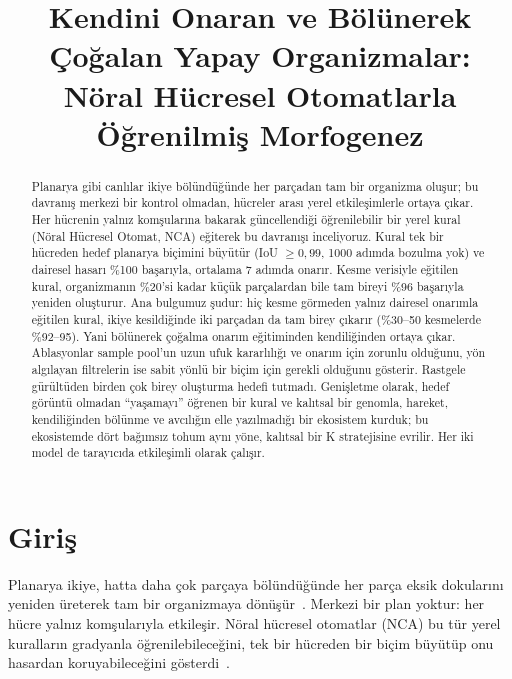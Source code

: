 \documentclass[conference]{IEEEtran}
\begin{document}
\title{Kendini Onaran ve Bölünerek Çoğalan Yapay Organizmalar:\\ Nöral Hücresel Otomatlarla Öğrenilmiş Morfogenez}
\author{}
\maketitle

\begin{abstract}
Planarya gibi canlılar ikiye bölündüğünde her parçadan tam bir organizma oluşur; bu davranış merkezi bir kontrol olmadan, hücreler arası yerel etkileşimlerle ortaya çıkar. Her hücrenin yalnız komşularına bakarak güncellendiği öğrenilebilir bir yerel kural (Nöral Hücresel Otomat, NCA) eğiterek bu davranışı inceliyoruz. Kural tek bir hücreden hedef planarya biçimini büyütür (IoU $\ge 0{,}99$, 1000 adımda bozulma yok) ve dairesel hasarı \%100 başarıyla, ortalama 7 adımda onarır. Kesme verisiyle eğitilen kural, organizmanın \%20'si kadar küçük parçalardan bile tam bireyi \%96 başarıyla yeniden oluşturur. Ana bulgumuz şudur: hiç kesme görmeden yalnız dairesel onarımla eğitilen kural, ikiye kesildiğinde iki parçadan da tam birey çıkarır (\%30--50 kesmelerde \%92--95). Yani bölünerek çoğalma onarım eğitiminden kendiliğinden ortaya çıkar. Ablasyonlar sample pool'un uzun ufuk kararlılığı ve onarım için zorunlu olduğunu, yön algılayan filtrelerin ise sabit yönlü bir biçim için gerekli olduğunu gösterir. Rastgele gürültüden birden çok birey oluşturma hedefi tutmadı. Genişletme olarak, hedef görüntü olmadan ``yaşamayı'' öğrenen bir kural ve kalıtsal bir genomla, hareket, kendiliğinden bölünme ve avcılığın elle yazılmadığı bir ekosistem kurduk; bu ekosistemde dört bağımsız tohum aynı yöne, kalıtsal bir K stratejisine evrilir. Her iki model de tarayıcıda etkileşimli olarak çalışır.
\end{abstract}

\section{Giriş}
Planarya ikiye, hatta daha çok parçaya bölündüğünde her parça eksik dokularını yeniden üreterek tam bir organizmaya dönüşür~\cite{durant2017longterm,pietak2019planaria}. Merkezi bir plan yoktur: her hücre yalnız komşularıyla etkileşir. Nöral hücresel otomatlar (NCA) bu tür yerel kuralların gradyanla öğrenilebileceğini, tek bir hücreden bir biçim büyütüp onu hasardan koruyabileceğini gösterdi~\cite{mordvintsev2020growing}.
\end{document}
